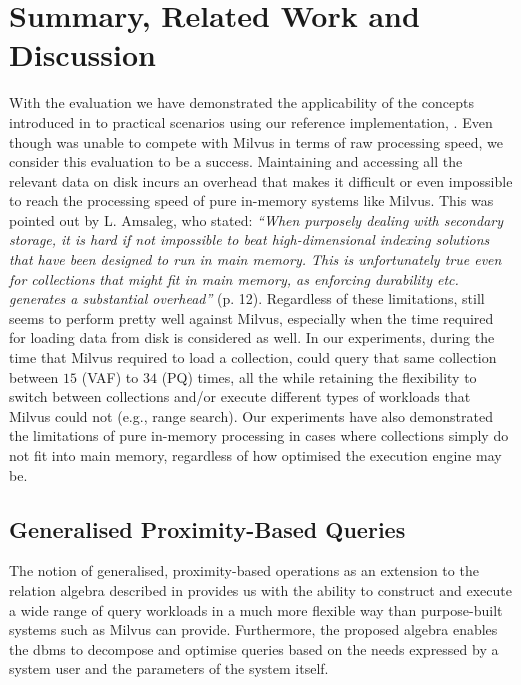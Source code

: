 \newpage
 
\section{Summary, Related Work and Discussion}
\label{section:discussion}

With the evaluation we have demonstrated the applicability of the concepts introduced in  to practical scenarios using our reference implementation, \cottontail{}. Even though \cottontail{} was unable to compete with Milvus in terms of raw processing speed, we consider this evaluation to be a success. Maintaining and accessing all the relevant data on disk incurs an overhead that makes it difficult or even impossible to reach the processing speed of pure in-memory systems like Milvus. This was pointed out by L. Amsaleg, who stated: \emph{``When purposely dealing with secondary storage, it is hard if not impossible to beat high-dimensional indexing solutions that have been designed to run in main memory. This is unfortunately true even for collections that might fit in main memory, as enforcing durability etc. generates a substantial overhead''} \cite{Amsaleg:2014Database} (p. 12). Regardless of these limitations, \cottontail{} still seems to perform pretty well against Milvus, especially when the time required for loading data from disk is considered as well. In our experiments, during the time that Milvus required to load a collection, \cottontail{} could query that same collection between $15$ (VAF) to $34$ (PQ) times, all the while retaining the flexibility to switch between collections and/or execute different types of workloads that Milvus could not (e.g., range search). Our experiments have also demonstrated the limitations of pure in-memory processing in cases where collections simply do not fit into main memory, regardless of how optimised the execution engine may be.

\subsection{Generalised Proximity-Based Queries}

The notion of generalised, proximity-based operations as an extension to the relation algebra described in  provides us with the ability to construct and execute a wide range of query workloads in a much more flexible way than purpose-built systems such as Milvus \cite{Wang:2021Milvus} can provide. Furthermore, the proposed algebra enables the \acrshort{dbms} to decompose and optimise queries based on the needs expressed by a system user and the parameters of the system itself. 

